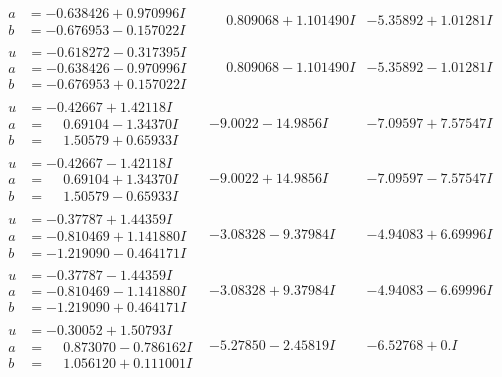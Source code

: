 \documentclass[1p]{elsarticle_modified}
\theoremstyle{definition}
\begin{document}
$$\begin{array}{c|c|c}
\begin{aligned}
a &= -0.638426 + 0.970996 I \\
b &= -0.676953 - 0.157022 I\end{aligned}
 & \phantom{-}0.809068 + 1.101490 I & -5.35892 + 1.01281 I \\ \hline\begin{aligned}
u &= -0.618272 - 0.317395 I \\
a &= -0.638426 - 0.970996 I \\
b &= -0.676953 + 0.157022 I\end{aligned}
 & \phantom{-}0.809068 - 1.101490 I & -5.35892 - 1.01281 I \\ \hline\begin{aligned}
u &= -0.42667 + 1.42118 I \\
a &= \phantom{-}0.69104 - 1.34370 I \\
b &= \phantom{-}1.50579 + 0.65933 I\end{aligned}
 & -9.0022 - 14.9856 I & -7.09597 + 7.57547 I \\ \hline\begin{aligned}
u &= -0.42667 - 1.42118 I \\
a &= \phantom{-}0.69104 + 1.34370 I \\
b &= \phantom{-}1.50579 - 0.65933 I\end{aligned}
 & -9.0022 + 14.9856 I & -7.09597 - 7.57547 I \\ \hline\begin{aligned}
u &= -0.37787 + 1.44359 I \\
a &= -0.810469 + 1.141880 I \\
b &= -1.219090 - 0.464171 I\end{aligned}
 & -3.08328 - 9.37984 I & -4.94083 + 6.69996 I \\ \hline\begin{aligned}
u &= -0.37787 - 1.44359 I \\
a &= -0.810469 - 1.141880 I \\
b &= -1.219090 + 0.464171 I\end{aligned}
 & -3.08328 + 9.37984 I & -4.94083 - 6.69996 I \\ \hline\begin{aligned}
u &= -0.30052 + 1.50793 I \\
a &= \phantom{-}0.873070 - 0.786162 I \\
b &= \phantom{-}1.056120 + 0.111001 I\end{aligned}
 & -5.27850 - 2.45819 I & -6.52768 + 0. I\phantom{ +0.000000I} \\ \hline\begin{aligned}

\end{aligned}
\end{array}$$
\end{document}
